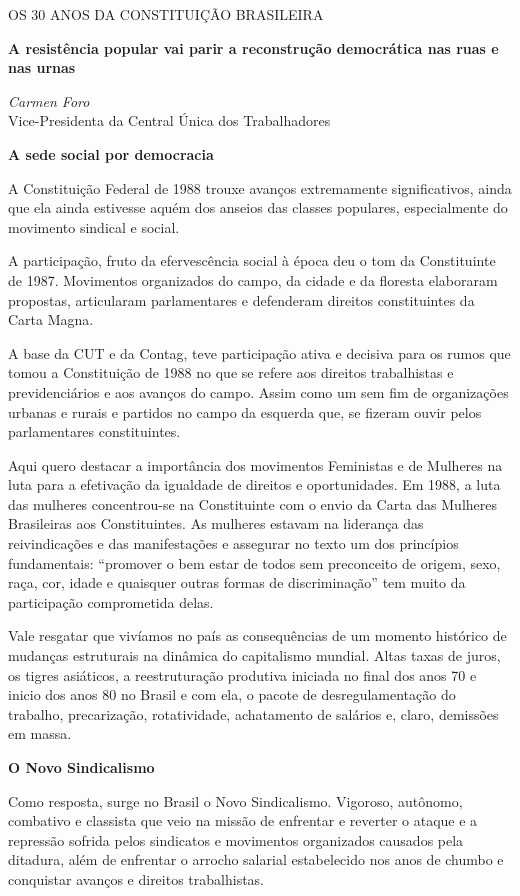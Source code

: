 OS 30 ANOS DA CONSTITUIÇÃO BRASILEIRA

\textbf{A resistência popular vai parir a reconstrução democrática nas
ruas e nas urnas}

\emph{Carmen Foro}\\
Vice-Presidenta da Central Única dos Trabalhadores

\textbf{A sede social por democracia}

A Constituição Federal de 1988 trouxe avanços extremamente
significativos, ainda que ela ainda estivesse aquém dos anseios das
classes populares, especialmente do movimento sindical e social.

A participação, fruto da efervescência social à época deu o tom da
Constituinte de 1987. Movimentos organizados do campo, da cidade e da
floresta elaboraram propostas, articularam parlamentares e defenderam
direitos constituintes da Carta Magna.

A base da CUT e da Contag, teve participação ativa e decisiva para os
rumos que tomou a Constituição de 1988 no que se refere aos direitos
trabalhistas e previdenciários e aos avanços do campo. Assim como um sem
fim de organizações urbanas e rurais e partidos no campo da esquerda
que, se fizeram ouvir pelos parlamentares constituintes.

Aqui quero destacar a importância dos movimentos Feministas e de
Mulheres na luta para a efetivação da igualdade de direitos e
oportunidades. Em 1988, a luta das mulheres concentrou-se na
Constituinte com o envio da Carta das Mulheres Brasileiras aos
Constituintes. As mulheres estavam na liderança das reivindicações e das
manifestações e assegurar no texto um dos princípios fundamentais:
``promover o bem estar de todos sem preconceito de origem, sexo, raça,
cor, idade e quaisquer outras formas de discriminação'' tem muito da
participação comprometida delas.

Vale resgatar que vivíamos no país as consequências de um momento
histórico de mudanças estruturais na dinâmica do capitalismo mundial.
Altas taxas de juros, os tigres asiáticos, a reestruturação produtiva
iniciada no final dos anos 70 e inicio dos anos 80 no Brasil e com ela,
o pacote de desregulamentação do trabalho, precarização, rotatividade,
achatamento de salários e, claro, demissões em massa.

\textbf{O Novo Sindicalismo}

Como resposta, surge no Brasil o Novo Sindicalismo. Vigoroso, autônomo,
combativo e classista que veio na missão de enfrentar e reverter o
ataque e a repressão sofrida pelos sindicatos e movimentos organizados
causados pela ditadura, além de enfrentar o arrocho salarial
estabelecido nos anos de chumbo e conquistar avanços e direitos
trabalhistas.

